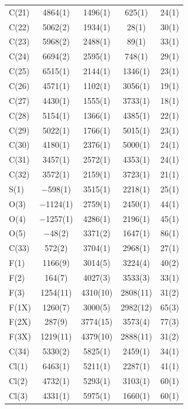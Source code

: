 \begin{center}
{\begin{supertabular}{lcccc}
C(21)&4864(1)&1496(1)&625(1)&24(1)\\
C(22)&5062(2)&1934(1)&28(1)&30(1)\\
C(23)&5968(2)&2488(1)&89(1)&33(1)\\
C(24)&6694(2)&2595(1)&748(1)&29(1)\\
C(25)&6515(1)&2144(1)&1346(1)&23(1)\\
C(26)&4571(1)&1102(1)&3056(1)&19(1)\\
C(27)&4430(1)&1555(1)&3733(1)&18(1)\\
C(28)&5154(1)&1366(1)&4385(1)&22(1)\\
C(29)&5022(1)&1766(1)&5015(1)&23(1)\\
C(30)&4180(1)&2376(1)&5000(1)&24(1)\\
C(31)&3457(1)&2572(1)&4353(1)&24(1)\\
C(32)&3572(1)&2159(1)&3723(1)&21(1)\\
S(1)&$-$598(1)&3515(1)&2218(1)&25(1)\\
O(3)&$-$1124(1)&2759(1)&2450(1)&44(1)\\
O(4)&$-$1257(1)&4286(1)&2196(1)&45(1)\\
O(5)&$-$48(2)&3371(2)&1647(1)&86(1)\\
C(33)&572(2)&3704(1)&2968(1)&27(1)\\
F(1)&1166(9)&3014(5)&3224(4)&40(2)\\
F(2)&164(7)&4027(3)&3533(3)&33(1)\\
F(3)&1254(11)&4310(10)&2808(11)&31(2)\\
F(1X)&1260(7)&3000(5)&2982(12)&65(3)\\
F(2X)&287(9)&3774(15)&3573(4)&77(3)\\
F(3X)&1219(11)&4379(10)&2888(11)&31(2)\\
C(34)&5330(2)&5825(1)&2459(1)&34(1)\\
Cl(1)&6463(1)&5211(1)&2287(1)&41(1)\\
Cl(2)&4732(1)&5293(1)&3103(1)&60(1)\\
Cl(3)&4331(1)&5975(1)&1660(1)&60(1)\\
\end{supertabular}
}
\end{center}

